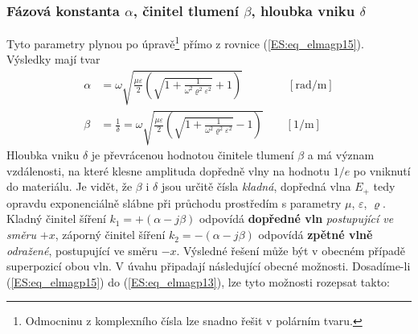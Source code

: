       \subsubsection{Fázová konstanta \(\alpha\), činitel tlumení \(\beta\), hloubka vniku 
                      \(\delta\)}
        Tyto parametry plynou po úpravě\footnote{Odmocninu z komplexního čísla lze snadno řešit v 
        polárním tvaru.} přímo z rovnice (\ref{ES:eq_elmagp15}). Výsledky mají tvar
        \begin{subequations}
          \begin{align}
            \alpha &= \omega\sqrt{
                              \frac{\mu\varepsilon}{2}
                                \left(
                                  \sqrt{1+\frac{1}{\omega^2\varrho^2\varepsilon^2}} +1 
                                \right)}                
                      \qquad\qquad [\si{\radian/\meter}]  \label{ES:eq_elmagp16a}  \\
            \beta  &= \frac{1}{\delta} 
                    = \omega\sqrt{
                              \frac{\mu\varepsilon}{2}
                                \left(
                                  \sqrt{1+\frac{1}{\omega^2\varrho^2\varepsilon^2}} -1
                                \right)}               
                      \qquad [\si{1/\meter}]               \label{ES:eq_elmagp16b}
          \end{align}
        \end{subequations}
        Hloubka vniku \(\delta\) je převrácenou hodnotou činitele tlumení \(\beta\) a má význam 
        vzdálenosti, na které klesne amplituda dopředně vlny na hodnotu \(1/e\) po vniknutí do 
        materiálu. Je vidět, že \(\beta\) i \(\delta\) jsou určitě čísla \emph{kladná}, dopředná 
        vlna \(E_+\) tedy opravdu exponenciálně slábne při průchodu prostředím s parametry \(\mu\), 
        \(\varepsilon\), \(\varrho\). Kladný činitel šíření \(k_1=+(\alpha-j\beta)\) odpovídá 
        \textbf{dopředné vln} \emph{postupující ve směru} \(+x\), záporný činitel šíření 
        \(k_2=-(\alpha-j\beta)\) odpovídá \textbf{zpětné vlně} \emph{odražené}, postupující ve 
        směru \(-x\). Výsledné řešení může být v obecném případě superpozicí obou vln. V úvahu 
        připadají následující obecné možnosti. Dosadíme-li (\ref{ES:eq_elmagp15}) do 
        (\ref{ES:eq_elmagp13}), lze tyto možnosti rozepsat takto:

